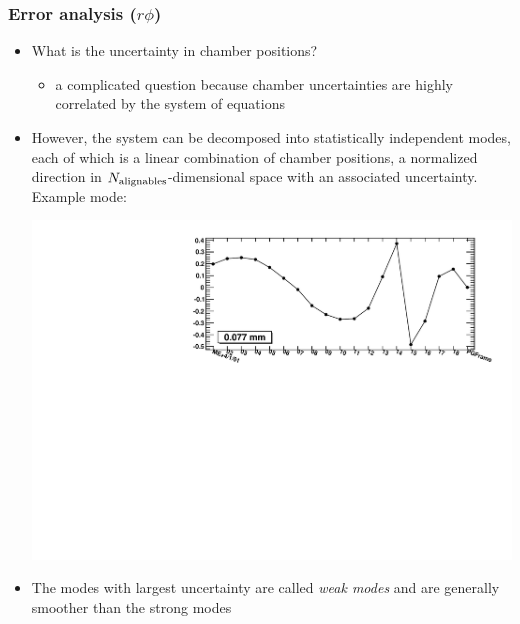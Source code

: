 \documentclass[compress]{beamer}
\begin{document}
\begin{frame}
\frametitle{Error analysis ($r\phi$)}

\begin{itemize}\setlength{\itemsep}{0.25 cm}
\item What is the uncertainty in chamber positions?
\begin{itemize}
\item a complicated question because chamber uncertainties are highly
  correlated by the system of equations
\end{itemize}
\item However, the system can be decomposed into statistically
  independent modes, each of which is a linear combination of chamber
  positions, a normalized direction in $N_{\mbox{\scriptsize alignables}}$-dimensional space with an associated uncertainty.  Example mode:

\includegraphics[width=0.8\linewidth]{example_errormode.pdf}

\item The modes with largest uncertainty are called {\it weak modes} and are generally smoother than the strong modes
\end{itemize}
\end{frame}
\end{document}
